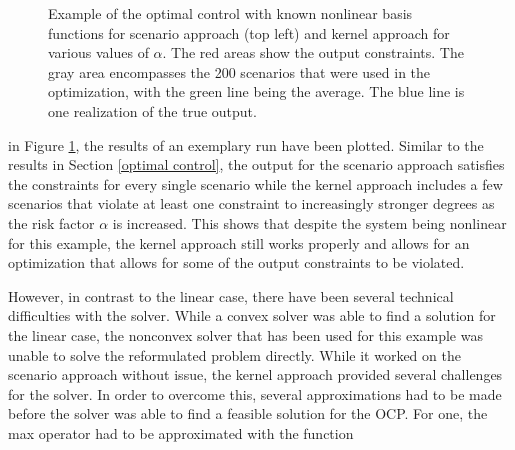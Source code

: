 \begin{figure}[htb]
{		\centering
 } 
\caption{Example of the optimal control with known nonlinear basis functions for scenario approach (top left) and kernel approach for various values of $\alpha$. The red areas show the output constraints. The gray area encompasses the 200 scenarios that were used in the optimization, with the green line being the average. The blue line is one realization of the true output.}
\label{ScenarioKernelComparisonNonLinear}
\end{figure}

in Figure \ref{ScenarioKernelComparisonNonLinear}, the results of an exemplary run have been plotted. Similar to the results in Section \ref{optimal control}, the output for the scenario approach satisfies the constraints for every single scenario while the kernel approach includes a few scenarios that violate at least one constraint to increasingly stronger degrees as the risk factor $\alpha$ is increased. This shows that despite the system being nonlinear for this example, the kernel approach still works properly and allows for an optimization that allows for some of the output constraints to be violated.

However, in contrast to the linear case, there have been several technical difficulties with the solver. While a convex solver was able to find a solution for the linear case, the nonconvex solver that has been used for this example was unable to solve the reformulated problem directly. While it worked on the scenario approach without issue, the kernel approach provided several challenges for the solver. In order to overcome this, several approximations had to be made before the solver was able to find a feasible solution for the OCP. For one, the max operator had to be approximated with the function

